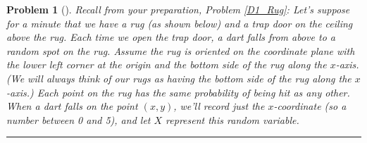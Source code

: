 \documentclass[letterpaper,oneside]{book}%
\theoremstyle{plain}
\theoremstyle{box}
\theoremstyle{problem}
\newtheorem{problemnum}{Problem}[chapter]
\newenvironment{problem}[1][]{\begin{problemnum}[#1]}{\end{problemnum}\nopagebreak\hrule\bigskip}
\begin{document}
\begin{problem}
\label{D1_RugContinued}
Recall from your preparation, Problem \ref{D1_Rug}: Let's suppose for a minute that we have a rug (as shown below) and a trap door on the ceiling above the rug. 
Each time we open the trap door, a dart falls from above to a random spot on the rug. 
Assume the rug is oriented on the coordinate plane with the lower left corner at the origin and the bottom side of the rug along the $x$-axis. (We will always think of our rugs as having the bottom side of the rug along the $x$-axis.) Each point on the rug has the same probability of being hit as any other. 
When a dart falls on the point $(x,y)$,  we'll record just the $x$-coordinate (so a number between 0 and 5), and let $X$ represent this random variable. 
 
 

\end{problem}
\end{document}
